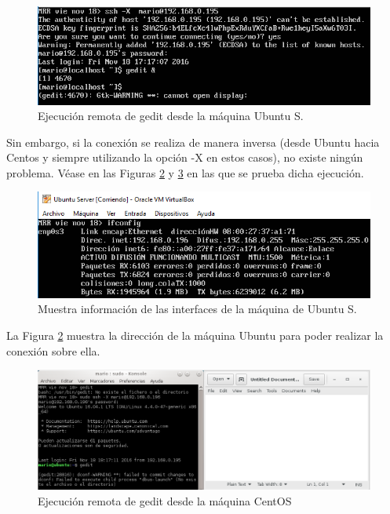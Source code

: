 \begin{figure}[H] %
	\centering
	\includegraphics[scale=0.7]{figuras/figura14.png} 
	\caption{Ejecución remota de gedit desde la máquina Ubuntu S.} 
	\label{fig:figura14}
\end{figure}


Sin embargo, si la conexión se realiza de manera inversa (desde Ubuntu hacia Centos y siempre utilizando la opción -X en estos casos), no existe ningún problema. Véase en las Figuras \ref{fig:figura16} y \ref{fig:figura17} en las que se prueba dicha ejecución.

\begin{figure}[H] %
	\centering
	\includegraphics[scale=0.7]{figuras/figura16.png} 
	\caption{Muestra información de las interfaces de la máquina de Ubuntu S.} 
	\label{fig:figura16}
\end{figure}

La Figura \ref{fig:figura16} muestra la dirección de la máquina Ubuntu para poder realizar la conexión sobre ella.

\begin{figure}[H] %
	\centering
	\includegraphics[scale=0.6]{figuras/figura17.png} 
	\caption{Ejecución remota de gedit desde la máquina CentOS} 
	\label{fig:figura17}
\end{figure}

